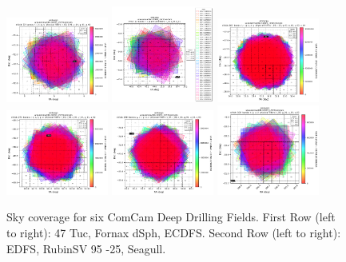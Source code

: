 \begin{figure}
    \begin{center}
        \includegraphics[width=0.3\textwidth]{observations_figures/showVisit_DM-30993_LSSTComCam_453.png}
        \includegraphics[width=0.3\textwidth]{observations_figures/showVisit_DM-30993_LSSTComCam_4016.png}
        \includegraphics[width=0.3\textwidth]{observations_figures/showVisit_DM-30993_LSSTComCam_5063.png}
        \includegraphics[width=0.3\textwidth]{observations_figures/showVisit_DM-30993_LSSTComCam_2394.png}
        \includegraphics[width=0.3\textwidth]{observations_figures/showVisit_DM-30993_LSSTComCam_5526.png}
        \includegraphics[width=0.3\textwidth]{observations_figures/showVisit_DM-30993_LSSTComCam_7611.png}
    \end{center}
    \caption{Sky coverage for six ComCam Deep Drilling Fields.
    First Row (left to right): 47 Tuc, Fornax dSph, ECDFS.
    Second Row (left to right): EDFS, RubinSV 95 -25, Seagull.}
    \label{fig:comcam_ddf_coverage}
\end{figure}

